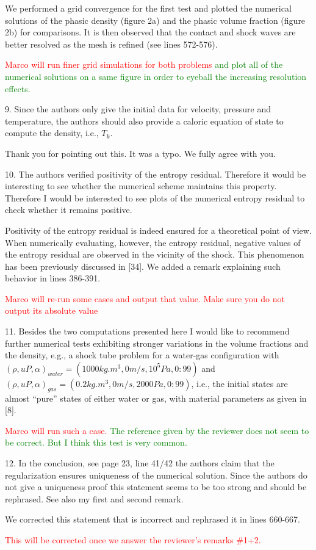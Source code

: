 \documentclass{article}
\newcommand{\tcr}[1]{\textcolor{red}{#1}}
\newcommand{\tcg}[1]{\textcolor{green}{#1}}
\begin{document}
We performed a grid convergence for the first test and plotted the numerical solutions of the phasic density (figure 2a) and
the phasic volume fraction (figure 2b) for comparisons. It is then observed that the contact and shock waves are better resolved as 
the mesh is refined (see lines 572-576). 

\tcr{Marco will run finer grid simulations for both problems} \tcg{ and plot all of the numerical solutions on a same
figure in order to eyeball the increasing resolution effects.}
\bigskip


{\color{blue}
9. Since the authors only give the initial data for velocity, pressure and temperature,
the authors should also provide a caloric equation of state to compute the density,
i.e., $T_k$.}

Thank you for pointing out this. It was a typo. We fully agree with you.
\bigskip


{\color{blue}
10. The authors verified positivity of the entropy residual. Therefore it would be 
interesting to see whether the numerical scheme maintains this property. Therefore I
would be interested to see plots of the numerical entropy residual to check whether
it remains positive.}

Positivity of the entropy residual is indeed ensured for a theoretical point of view. When numerically evaluating, however,
the entropy residual, negative values of the entropy residual are observed in the vicinity of the shock. This phenomenon
has been previously discussed in [34]. We added a remark explaining such behavior in lines 386-391.

\tcr{Marco will re-run some cases and output that value. Make sure you do not output its absolute value}
\bigskip


{\color{blue}
11. Besides the two computations presented here I would like to recommend further
numerical tests exhibiting stronger variations in the volume fractions and the density, 
e.g., a shock tube problem for a water-gas configuration with 
$(\rho, u P, \alpha)_{water} = (1000kg.m^3, 0m/s, 10^5Pa, 0:99)$ and 
$(\rho, u P, \alpha)_{gas}   = (0.2 kg.m^3, 0m/s, 2000Pa, 0:99)$,
i.e., the initial states are almost ``pure'' states of either water or gas, with material
parameters as given in [8].}

\tcr{Marco will run such a case.} \tcg{The reference given by the reviewer does not seem to be correct. But I think
this test is very common.}
\bigskip


{\color{blue}
12. In the conclusion, see page 23, line 41/42 the authors claim that the regularization
ensures uniqueness of the numerical solution. Since the authors do not give a 
uniqueness proof this statement seems to be too strong and should be rephrased. See also
my first and second remark.}

We corrected this statement that is incorrect and rephrased it in lines 660-667.

\tcr{This will be corrected once we answer the reviewer's remarks \#1+2.}
\bigskip


{\color{blue}
}

\bigskip


{\color{blue}
}

\bigskip
\end{document}
